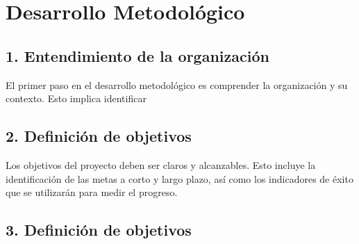 \chapter*{Desarrollo Metodológico}

\section*{1. Entendimiento de la organización}
El primer paso en el desarrollo metodológico es comprender la organización y su contexto. Esto implica identificar

\section*{2. Definición de objetivos}
Los objetivos del proyecto deben ser claros y alcanzables. Esto incluye la identificación de las metas a corto y largo plazo, así como los indicadores de éxito que se utilizarán para medir el progreso.

\section*{3. Definición de objetivos}